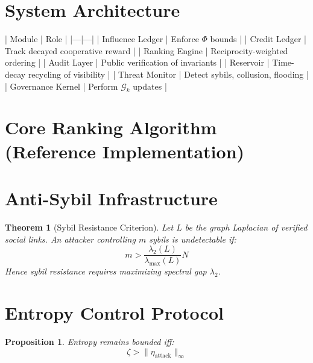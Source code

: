 \documentclass[11pt,a4paper]{article}
\theoremstyle{plain}
\newtheorem{theorem}{Theorem}[section]
\newtheorem{proposition}{Proposition}[section]
\theoremstyle{definition}
\theoremstyle{remark}
\begin{document}
\section{System Architecture}

| Module | Role |
|---|---|
| Influence Ledger | Enforce $\Phi$ bounds |
| Credit Ledger | Track decayed cooperative reward |
| Ranking Engine | Reciprocity-weighted ordering |
| Audit Layer | Public verification of invariants |
| Reservoir | Time-decay recycling of visibility |
| Threat Monitor | Detect sybils, collusion, flooding |
| Governance Kernel | Perform $\mathcal{G}_k$ updates |

\section{Core Ranking Algorithm (Reference Implementation)}

\begin{algorithm}[H]
\caption{Constitutional Reciprocity Ranking}
\end{algorithm}

\section{Anti-Sybil Infrastructure}

\begin{theorem}[Sybil Resistance Criterion]
Let $L$ be the graph Laplacian of verified social links.  
An attacker controlling $m$ sybils is undetectable if:
\[
m > \frac{\lambda_2(L)}{\lambda_{\max}(L)}N
\]
Hence sybil resistance requires maximizing spectral gap $\lambda_2$.
\end{theorem}

\section{Entropy Control Protocol}

\begin{proposition}
Entropy remains bounded iff:
\[
\zeta > \|\eta_{\text{attack}}\|_\infty
\]
\end{proposition}
\end{document}
